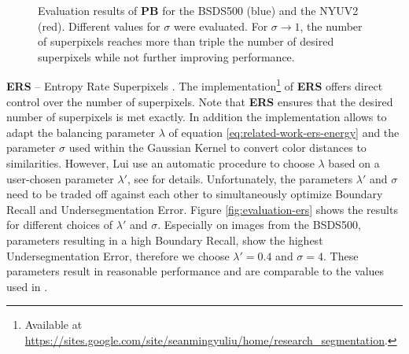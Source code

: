 \begin{figure}[b]
{
	}
	\caption[Evaluation results of \textbf{PB} \cite{ZhangHartleyMashfordBurn:2011} obtained on the validation set of the Berkeley Segmentation Dataset \cite{ArbelaezMaireFowlkesMalik:2011} and the training set of the NYU Depth Dataset \cite{SilbermanHoiemKohliFergus:2012}.]{Evaluation results of \textbf{PB} for the BSDS500 (blue) and the NYUV2 (red). Different values for $\sigma$ were evaluated. For $\sigma \rightarrow 1$, the number of superpixels reaches more than triple the number of desired superpixels while not further improving performance.}
	\label{fig:evaluation-pb}
\end{figure}
\textbf{ERS} -- Entropy Rate Superpixels \cite{LiuTuzelRamalingamChellappa:2011}. The implementation\footnote{Available at \url{https://sites.google.com/site/seanmingyuliu/home/research_segmentation}.} of \textbf{ERS} offers direct control over the number of superpixels. Note that \textbf{ERS} ensures that the desired number of superpixels is met exactly. In addition the implementation allows to adapt the balancing parameter $\lambda$ of equation \eqref{eq:related-work-ers-energy} and the parameter $\sigma$ used within the Gaussian Kernel to convert color distances to similarities. However, Lui \etal use an automatic procedure to choose $\lambda$ based on a user-chosen parameter $\lambda'$, see \cite{LiuTuzelRamalingamChellappa:2011} for details. Unfortunately, the parameters $\lambda'$ and $\sigma$ need to be traded off against each other to simultaneously optimize Boundary Recall and Undersegmentation Error. Figure \ref{fig:evaluation-ers} shows the results for different choices of $\lambda'$ and $\sigma$. Especially on images from the BSDS500, parameters resulting in a high Boundary Recall, show the highest Undersegmentation Error, therefore we choose $\lambda' = 0.4$ and $\sigma = 4$. These parameters result in reasonable performance and are comparable to the values used in \cite{LiuTuzelRamalingamChellappa:2011}.
